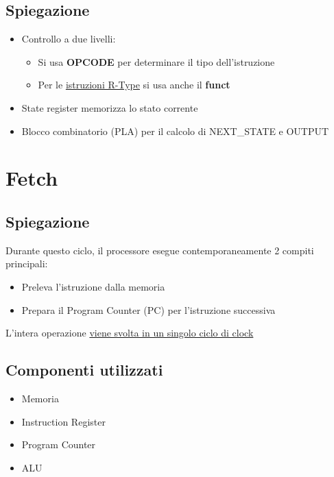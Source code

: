 \subsection{Spiegazione}
\begin{itemize}
    \item Controllo a due livelli:
        \begin{itemize}
            \item Si usa \textbf{OPCODE} per determinare il tipo dell'istruzione
            \item Per le \uline{istruzioni R-Type} si usa anche il \textbf{funct}
        \end{itemize}
    
    \item State register memorizza lo stato corrente
    
    \item Blocco combinatorio (PLA) per il calcolo di NEXT\_STATE e OUTPUT
\end{itemize}

\newpage

\section{Fetch}
\subsection{Spiegazione}
Durante questo ciclo, il processore esegue contemporaneamente 2 compiti principali:
    \begin{itemize}
        \item Preleva l'istruzione dalla memoria
        \item Prepara il Program Counter (PC) per l'istruzione successiva
    \end{itemize}

L'intera operazione \uline{viene svolta in un singolo ciclo di clock}
\subsection{Componenti utilizzati}
\begin{itemize}
    \item Memoria
    \item Instruction Register
    \item Program Counter
    \item ALU
\end{itemize}



